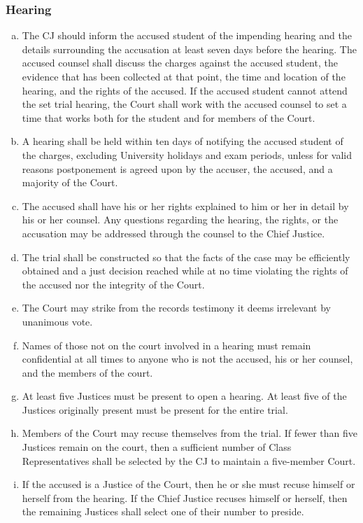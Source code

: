 \documentclass[USletter,12pt]{article}
\begin{document}
\begin{enumerate}[(a)]
\subsubsection{Hearing}
\begin{enumerate}[(a)]
\item The CJ should inform the accused student of the impending hearing and the details surrounding the accusation at least seven days before the hearing.  The accused counsel shall discuss the charges against the accused student, the evidence that has been collected at that point, the time and location of the hearing, and the rights of the accused.  If the accused student cannot attend the set trial hearing, the Court shall work with the accused counsel to set a time that works both for the student and for members of the Court.
\item A hearing shall be held within ten days of notifying the accused student of the charges, excluding University holidays and exam periods, unless for valid reasons postponement is agreed upon by the accuser, the accused, and a majority of the Court.
\item The accused shall have his or her rights explained to him or her in detail by his or her counsel.  Any questions regarding the hearing, the rights, or the accusation may be addressed through the counsel to the Chief Justice.
\item The trial shall be constructed so that the facts of the case may be efficiently obtained and a just decision reached while at no time violating the rights of the accused nor the integrity of the Court.
\item The Court may strike from the records testimony it deems irrelevant by unanimous vote.
\item Names of those not on the court involved in a hearing must remain confidential at all times to anyone who is not the accused, his or her counsel, and the members of the court.
\item At least five Justices must be present to open a hearing.  At least five of the Justices originally present must be present for the entire trial.
\item Members of the Court may recuse themselves from the trial.  If fewer than five Justices remain on the court, then a sufficient number of Class Representatives shall be selected by the CJ to maintain a five-member Court.
\item If the accused is a Justice of the Court, then he or she must recuse himself or herself from the hearing. If the Chief Justice recuses himself or herself, then the remaining Justices shall select one of their number to preside.

\end{enumerate}
\end{enumerate}
\end{document}

